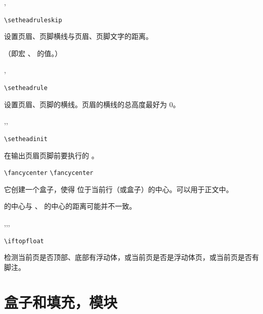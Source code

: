\documentclass[twoside]{book}
\def\xampletext{\par}
\def\xampleprint{\xamplecode \xampleline \xampletext}
\begin{document}
\begin{function}{\setheadruleskip,\setfootruleskip}
  \begin{syntax}
    \verb|\setheadruleskip| 
  \end{syntax}
设置页眉、页脚横线与页眉、页脚文字的距离。

（即宏 、 的值。）
\end{function}

\begin{function}{\setheadrule,\setfootrule}
  \begin{syntax}
    \verb|\setheadrule| 
  \end{syntax}
设置页眉、页脚的横线。页眉的横线的总高度最好为 0。
\end{function}

\begin{function}{\setheadinit,\setfootinit,\setheadfootinit}
  \begin{syntax}
    \verb|\setheadinit| 
  \end{syntax}
在输出页眉页脚前要执行的 。
\end{function}

\begin{function}{\fancycenter}
  \begin{syntax}
    \verb|\fancycenter|   
    \verb|\fancycenter|     
  \end{syntax}
它创建一个盒子，使得  位于当前行（或盒子）的中心。可以用于正文中。

 的中心与 、 的中心的距离可能并不一致。
\end{function}

\begin{xample}
\stopxamplecode
\xampleprint
\end{xample}

\begin{function}[EXP]{\iftopfloat,\ifbotfloat,\iffloatpage,\iffootnote}
  \begin{syntax}
    \verb|\iftopfloat|  
  \end{syntax}
检测当前页是否顶部、底部有浮动体，或当前页是否是浮动体页，或当前页是否有脚注。
\end{function}


\section{盒子和填充，模块}
\end{document}
